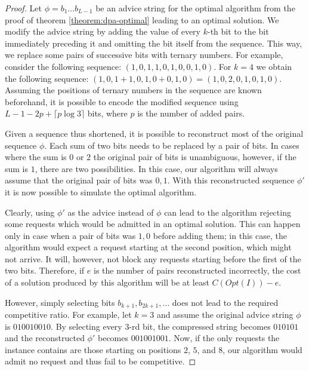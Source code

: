 \begin{proof}
    Let $\phi = b_1\dots{}b_{L-1}$ be an advice string for the optimal
    algorithm from the proof of theorem \ref{theorem:dpa-optimal} leading
    to an optimal solution. We modify the advice string by adding the
    value of every $k$-th bit to the bit immediately preceding it and
    omitting the bit itself from the sequence. This way, we replace some
    pairs of successive bits with ternary numbers. For example, consider
    the following sequence: $(1,0,1,1,0,1,0,0,1,0)$. For $k=4$ we obtain
    the following sequence: $(1,0,1+1,0,1,0+0,1,0) = (1,0,2,0,1,0,1,0)$.
    Assuming the positions of ternary numbers in the sequence are known
    beforehand, it is possible to encode the modified sequence using $L -
    1 - 2p + \lceil{}p\log{}3\rceil$ bits, where $p$ is the number of
    added pairs.

    Given a sequence thus shortened, it is possible to reconstruct most of
    the original sequence $\phi$. Each sum of two bits needs to be
    replaced by a pair of bits. In cases where the sum is $0$ or $2$ the
    original pair of bits is unambiguous, however, if the sum is $1$,
    there are two possibilities. In this case, our algorithm will always
    assume that the original pair of bits was $0, 1$. With this
    reconstructed sequence $\phi'$ it is now possible to simulate the
    optimal algorithm.

    Clearly, using $\phi'$ as the advice instead of $\phi$ can lead to the
    algorithm rejecting some requests which would be admitted in an
    optimal solution. This can happen only in case when a pair of bits was
    $1, 0$ before adding them; in this case, the algorithm would expect a
    request starting at the second position, which might not arrive. It
    will, however, not block any requests starting before the first of the
    two bits. Therefore, if $e$ is the number of pairs reconstructed
    incorrectly, the cost of a solution produced by this algorithm will be
    at least $C(Opt(I)) - e$.

    However, simply selecting bits $b_{k+1}, b_{2k+1}, \dots$ does not lead to
    the required competitive ratio. For example, let $k = 3$ and assume
    the original advice string $\phi$ is $010010010$. By selecting every
    $3$-rd bit, the compressed string becomes $010101$ and the
    reconstructed $\phi'$ becomes $001001001$. Now, if the only requests
    the instance contains are those starting on positions $2$, $5$, and
    $8$, our algorithm would admit no request and thus fail to be
    competitive.


\end{proof}
